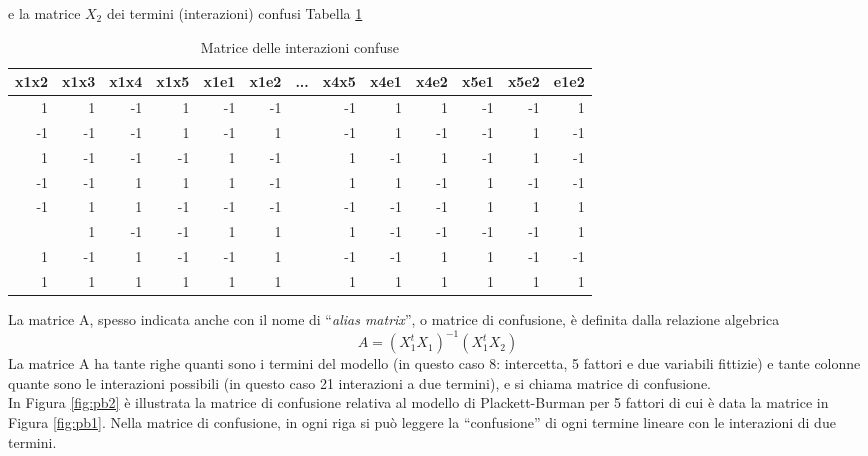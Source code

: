 \documentclass[
  11pt,
]{book}
\begin{document}
e la matrice \(X_2\) dei termini (interazioni) confusi Tabella \ref{tab:pbmatrconf}

\begin{table}

\caption{\label{tab:pbmatrconf}Matrice delle interazioni confuse}
\centering
\begin{tabular}[t]{rrrrrrlrrrrrr}
\toprule
x1x2 & x1x3 & x1x4 & x1x5 & x1e1 & x1e2 & ... & x4x5 & x4e1 & x4e2 & x5e1 & x5e2 & e1e2\\
\midrule
1 & 1 & -1 & 1 & -1 & -1 &  & -1 & 1 & 1 & -1 & -1 & 1\\
-1 & -1 & -1 & 1 & -1 & 1 &  & -1 & 1 & -1 & -1 & 1 & -1\\
1 & -1 & -1 & -1 & 1 & -1 &  & 1 & -1 & 1 & -1 & 1 & -1\\
-1 & -1 & 1 & 1 & 1 & -1 &  & 1 & 1 & -1 & 1 & -1 & -1\\
-1 & 1 & 1 & -1 & -1 & -1 &  & -1 & -1 & -1 & 1 & 1 & 1\\
\addlinespace
-1 & 1 & -1 & -1 & 1 & 1 &  & 1 & -1 & -1 & -1 & -1 & 1\\
1 & -1 & 1 & -1 & -1 & 1 &  & -1 & -1 & 1 & 1 & -1 & -1\\
1 & 1 & 1 & 1 & 1 & 1 &  & 1 & 1 & 1 & 1 & 1 & 1\\
\bottomrule
\end{tabular}
\end{table}

La matrice A, spesso indicata anche con il nome di ``\emph{alias matrix}'', o matrice di confusione, è definita dalla relazione algebrica
\[
A=(X_1^tX_1)^{-1}(X_1^tX_2)
\]
La matrice A ha tante righe quanti sono i termini del modello (in questo caso 8: intercetta, 5 fattori e due variabili fittizie) e tante colonne quante sono le interazioni possibili (in questo caso 21 interazioni a due termini), e si chiama matrice di confusione.\\
In Figura \ref{fig:pb2} è illustrata la matrice di confusione relativa al modello di Plackett-Burman per 5 fattori di cui è data la matrice in Figura \ref{fig:pb1}. Nella matrice di confusione, in ogni riga si può leggere la ``confusione'' di ogni termine lineare con le interazioni di due termini.
\end{document}
